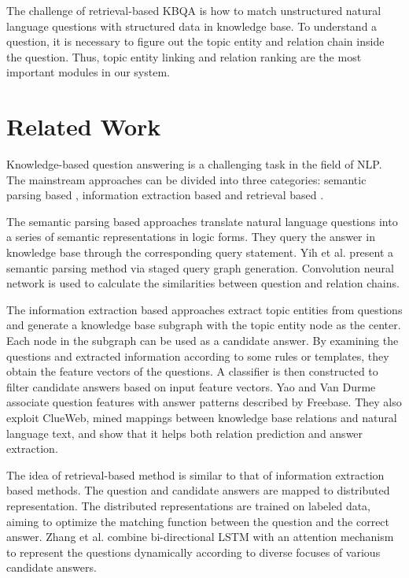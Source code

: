 \documentclass{llncs}
\begin{document}
The challenge of retrieval-based KBQA is how to match unstructured natural
language questions with structured data in knowledge base. To understand a 
question, it is necessary to figure out the topic entity and relation chain 
inside the question. Thus, topic entity linking and relation ranking are the 
most important modules in our system.

\section{Related Work}
Knowledge-based question answering is a challenging task in the field of NLP. 
The mainstream approaches can be divided into three categories: semantic 
parsing based\cite{Zettlemoyer}\cite{Kwiatkowski}\cite{Liang}\cite{Berant1}
\cite{Berant2}, information extraction based \cite{Bast}\cite{Fader}
\cite{Yao} and retrieval based \cite{Bordes}\cite{Bordes2}\cite{Dong}.

The semantic parsing based approaches translate natural language questions into a
series of semantic representations in logic forms. They query the answer in knowledge
base through the corresponding query statement. Yih et al.\cite{Yih} present a semantic
parsing method via staged query graph generation. Convolution neural network is used
to calculate the similarities between question and relation chains.

The information extraction based approaches extract topic entities from questions
and generate a knowledge base subgraph with the topic entity node as the center. Each
node in the subgraph can be used as a candidate answer. By examining the questions
and extracted information according to some rules or templates, they obtain the feature
vectors of the questions. A classifier is then constructed to filter candidate answers
based on input feature vectors. Yao and Van Durme \cite{Yao2} associate question features
with answer patterns described by Freebase. They also exploit ClueWeb, mined
mappings between knowledge base relations and natural language text, and show that it
helps both relation prediction and answer extraction.

The idea of retrieval-based method is similar to that of information extraction based
methods. The question and candidate answers are mapped to distributed representation.
The distributed representations are trained on labeled data, aiming to optimize the
matching function between the question and the correct answer. Zhang et al. \cite{Zhang}
combine bi-directional LSTM with an attention mechanism to represent the questions
dynamically according to diverse focuses of various candidate answers.
\end{document}

